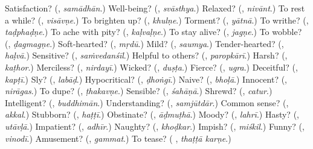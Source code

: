 \begin{tcolorbox}[breakable,colback=teal!4,colframe=teal!35!black,title={Before you move on}]
Satisfaction? (\textbf{}, \emph{samādhān}.) Well-being? (\textbf{}, \emph{svāsthya}.) Relaxed? (\textbf{}, \emph{nivānt}.) To rest a while? (\textbf{}, \emph{visāvṇe}.) To brighten up? (\textbf{}, \emph{khulṇe}.) Torment? (\textbf{}, \emph{yātnā}.) To writhe? (\textbf{}, \emph{taḍphaḍṇe}.) To ache with pity? (\textbf{}, \emph{kaḷvaḷṇe}.) To stay alive? (\textbf{}, \emph{jagṇe}.) To wobble? (\textbf{}, \emph{ḍagmagṇe}.) Soft-hearted? (\textbf{}, \emph{mṛdū}.) Mild? (\textbf{}, \emph{saumya}.) Tender-hearted? (\textbf{}, \emph{haḷvā}.) Sensitive? (\textbf{}, \emph{saṁvedanśīl}.) Helpful to others? (\textbf{}, \emph{paropkārī}.) Harsh? (\textbf{}, \emph{kaṭhor}.) Merciless? (\textbf{}, \emph{nirdayī}.) Wicked? (\textbf{}, \emph{duṣṭa}.) Fierce? (\textbf{}, \emph{ugra}.) Deceitful? (\textbf{}, \emph{kapṭī}.) Sly? (\textbf{}, \emph{labāḍ}.) Hypocritical? (\textbf{}, \emph{ḍhoṅgī}.) Naive? (\textbf{}, \emph{bhoḷā}.) Innocent? (\textbf{}, \emph{nirāgas}.) To dupe? (\textbf{}, \emph{ṭhakavṇe}.) Sensible? (\textbf{}, \emph{śahāṇā}.) Shrewd? (\textbf{}, \emph{catur}.) Intelligent? (\textbf{}, \emph{buddhimān}.) Understanding? (\textbf{}, \emph{samjūtdār}.) Common sense? (\textbf{}, \emph{akkal}.) Stubborn? (\textbf{}, \emph{haṭṭī}.) Obstinate? (\textbf{}, \emph{āḍmuṭhā}.) Moody? (\textbf{}, \emph{lahrī}.) Hasty? (\textbf{}, \emph{utāvḷā}.) Impatient? (\textbf{}, \emph{adhīr}.) Naughty? (\textbf{}, \emph{khoḍkar}.) Impish? (\textbf{}, \emph{miśkil}.) Funny? (\textbf{}, \emph{vinodī}.) Amusement? (\textbf{}, \emph{gammat}.) To tease? (\textbf{ }, \emph{thaṭṭā karṇe}.)
\end{tcolorbox}
